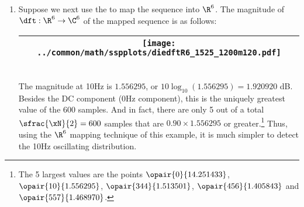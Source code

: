 \begin{example}
\begin{enumerate}
  \item \label{item:nonstat34_R6}
    Suppose we next use the   to map
    the sequence into $\R^6$.
    The magnitude of $\dft:\R^6\to\C^6$ of the mapped sequence is as follows:
    \\\begin{tabular}{|>{\scs}c|}
         \hline
         \texttt{[image: ../common/math/sspplots/diedftR6\_1525\_1200m120.pdf]}%
       \\\hline
    \end{tabular}\\
    The magnitude at 10Hz is $1.556295$, or $10\log_{10}(1.556295)=1.920920$ dB.
    Besides the DC component (0Hz component), this is the uniquely greatest value of the 600 samples.
    And in fact, there are only 5 out of a total $\sfrac{\xN}{2}=600$ samples
    that are $0.90\times1.556295$ or greater.\footnote{ 
      The 5 largest values are the points
      $\opair{0}{14.251433}$, $\opair{10}{1.556295}$, $\opair{344}{1.513501}$, $\opair{456}{1.405843}$ and $\opair{557}{1.468970}$.
      } 
    Thus, using the $\R^6$ mapping technique of this example, 
    it is much simpler to detect the 10Hz oscillating distribution.
\end{enumerate}
\end{example}

